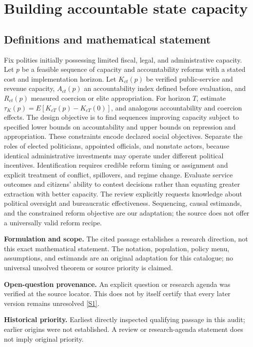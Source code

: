 \documentclass[11pt]{article}
\newcommand{\sref}[2]{\hyperlink{source:#1:#2}{[S#2]}}
\begin{document}
\section*{Building accountable state capacity}\label{30007663}
\subsection{Definitions and mathematical statement}
Fix polities initially possessing limited fiscal, legal, and administrative capacity. Let \(p\) be a feasible sequence of capacity and accountability reforms with a stated cost and implementation horizon. Let \(K_{ct}(p)\) be verified public-service and revenue capacity, \(A_{ct}(p)\) an accountability index defined before evaluation, and \(R_{ct}(p)\) measured coercion or elite appropriation. For horizon \(T\), estimate \(\tau_K(p)=E[K_{cT}(p)-K_{cT}(0)]\), and analogous accountability and coercion effects. The design objective is to find sequences improving capacity subject to specified lower bounds on accountability and upper bounds on repression and appropriation. These constraints encode declared social objectives. Separate the roles of elected politicians, appointed officials, and nonstate actors, because identical administrative investments may operate under different political incentives. Identification requires credible reform timing or assignment and explicit treatment of conflict, spillovers, and regime change. Evaluate service outcomes and citizens' ability to contest decisions rather than equating greater extraction with better capacity. The review explicitly requests knowledge about political oversight and bureaucratic effectiveness. Sequencing, causal estimands, and the constrained reform objective are our adaptation; the source does not offer a universally valid reform recipe.

\par\textbf{Formulation and scope.} The cited passage establishes a research direction, not this exact mathematical statement. The notation, population, policy menu, assumptions, and estimands are an original adaptation for this catalogue; no universal unsolved theorem or source priority is claimed.

\par\textbf{Open-question provenance.} An explicit question or research agenda was verified at the source locator. This does not by itself certify that every later version remains unresolved \sref{30007663}{1}.

\par\textbf{Historical priority.} Earliest directly inspected qualifying passage in this audit; earlier origins were not established. A review or research-agenda statement does not imply original priority.
\end{document}
